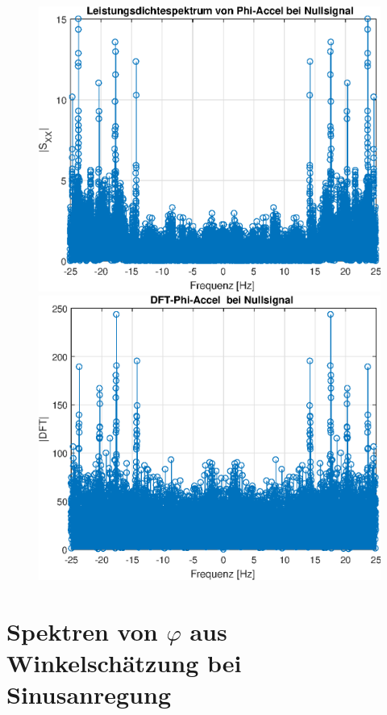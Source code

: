 \documentclass{article}
\begin{document}
\begin{figure}[h!]
\includegraphics[width=0.5\linewidth]{img/lds_phi_a_zerosig}
\includegraphics[width=0.5\linewidth]{img/dft_phi_a_zerosig}
\end{figure}

\newpage
\section{Spektren von $\varphi$ aus Winkelschätzung bei Sinusanregung}
\end{document}
